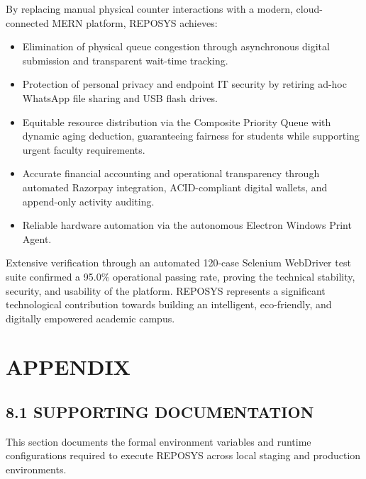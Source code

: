 \documentclass[12pt,a4paper,oneside]{report}
\begin{document}
By replacing manual physical counter interactions with a modern, cloud-connected MERN platform, REPOSYS achieves:
\begin{itemize}[leftmargin=0.35in, itemsep=2pt]
  \item Elimination of physical queue congestion through asynchronous digital submission and transparent wait-time tracking.
  \item Protection of personal privacy and endpoint IT security by retiring ad-hoc WhatsApp file sharing and USB flash drives.
  \item Equitable resource distribution via the Composite Priority Queue with dynamic aging deduction, guaranteeing fairness for students while supporting urgent faculty requirements.
  \item Accurate financial accounting and operational transparency through automated Razorpay integration, ACID-compliant digital wallets, and append-only activity auditing.
  \item Reliable hardware automation via the autonomous Electron Windows Print Agent.
\end{itemize}

Extensive verification through an automated 120-case Selenium WebDriver test suite confirmed a 95.0\% operational passing rate, proving the technical stability, security, and usability of the platform. REPOSYS represents a significant technological contribution towards building an intelligent, eco-friendly, and digitally empowered academic campus.

\chapter{APPENDIX}

\section{8.1 SUPPORTING DOCUMENTATION}
This section documents the formal environment variables and runtime configurations required to execute REPOSYS across local staging and production environments.
\end{document}
